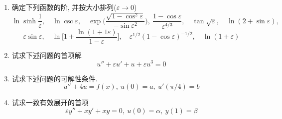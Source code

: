 
\begin{enumerate}
\item 确定下列函数的阶, 并按大小排列($\varepsilon\rightarrow 0$)
\[
\ln\sinh\frac{1}{\varepsilon},\quad
\ln\csc\varepsilon,\quad
\exp\Big(\frac{\sqrt{1-\cos^2\varepsilon}}{-\sin\varepsilon^2}\Big),\:
\frac{1-\cos\varepsilon}{\varepsilon^{4/3}},\quad
\tan\sqrt{\varepsilon},\quad
\ln(2+\sin\varepsilon),\quad
\]
\[
\varepsilon\sin\varepsilon,\quad
\ln\bigg[1+\frac{\ln(1+1\varepsilon)}{1-\varepsilon}\bigg],\quad
\varepsilon^{1/2}(1-\cos\varepsilon)^{-1/2},\quad
\ln(1+\varepsilon)
\]

\vspace{0.5em}
\item 试求下述问题的首项解
\[
u''+\varepsilon u'+u +\varepsilon u^3 = 0
\]

\vspace{0.5em}
\item 试求下述问题的可解性条件.
\[
u'' + 4u= f(x),\:
u(0) = a, \:
u'(\pi/4)=b
\]

\vspace{0.5em}
\item 试求一致有效展开的首项
\[
\varepsilon y'' + xy' + xy = 0,\:
u(0)=\alpha,\:
y(1) = \beta
\]
\end{enumerate} 

\newpage
{}
\begin{center}
\end{center}
